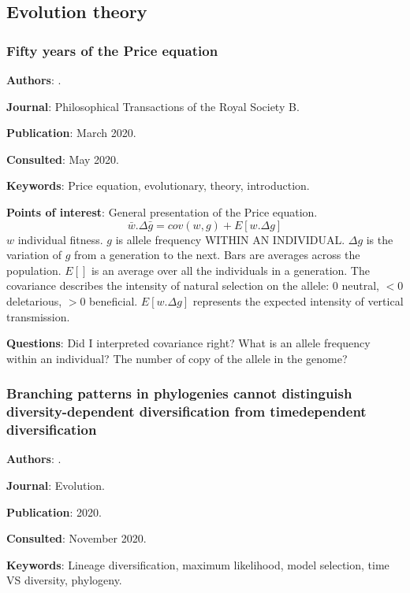 \documentclass[12pt,a4paper]{article}
\begin{document}
\subsection*{Evolution theory}

\subsubsection*{Fifty years of the Price equation}

\textbf{Authors}: \cite{lethtonen2020price}.

\textbf{Journal}: Philosophical Transactions of the Royal Society B.

\textbf{Publication}: March 2020.

\textbf{Consulted}: May 2020.

\textbf{Keywords}: Price equation, evolutionary, theory, introduction.

\textbf{Points of interest}: General presentation of the Price equation.
\begin{equation}
\bar{w}.\Delta\bar{g} = cov(w,g) + E[w.\Delta g]
\end{equation}
$w$ individual fitness. $g$ is allele frequency WITHIN AN INDIVIDUAL. $\Delta{g}$ is the variation of $g$ from a generation to the next. Bars are averages across the population. $E[]$ is an average over all the individuals in a generation.
The covariance describes the intensity of natural selection on the allele: 0 neutral, $<0$ deletarious, $>0$ beneficial.
$E[w.\Delta g]$ represents the expected intensity of vertical transmission.

\textbf{Questions}: Did I interpreted covariance right? What is an allele frequency within an individual? The number of copy of the allele in the genome?

\newpage

\subsubsection*{Branching patterns in phylogenies cannot distinguish diversity-dependent diversification from timedependent diversification}

\textbf{Authors}: \cite{pannetier2020branching}.

\textbf{Journal}: Evolution.

\textbf{Publication}: 2020.

\textbf{Consulted}: November 2020.

\textbf{Keywords}: Lineage diversification, maximum likelihood, model selection, time VS diversity, phylogeny.
\end{document}
